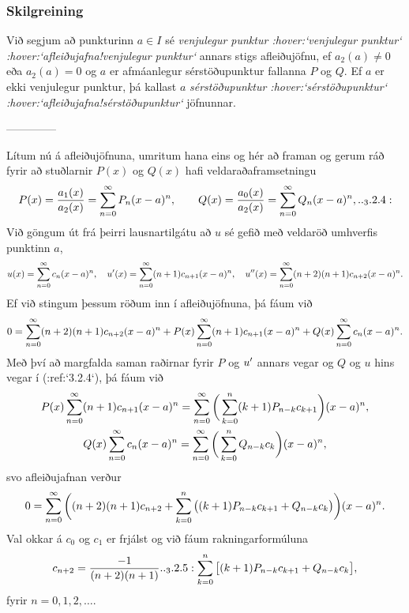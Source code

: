 \subsubsection{Skilgreining}
Við segjum að punkturinn $a\in I$ sé {\it venjulegur
punktur :hover:`venjulegur punktur` :hover:`afleiðujafna!venjulegur
punktur`} annars stigs
afleiðujöfnu, ef
$a_2(a)\neq 0$ eða $a_2(a)=0$ og $a$ er afmáanlegur sérstöðupunktur
fallanna $P$ og $Q$.  Ef $a$ er ekki venjulegur punktur, þá kallast $a$ {\it
sérstöðupunktur :hover:`sérstöðupunktur` :hover:`afleiðujafna!sérstöðupunktur`}
jöfnunnar. 


--------------




Lítum nú á afleiðujöfnuna, umritum hana eins og hér að framan
og gerum ráð fyrir að stuðlarnir $P(x)$ og $Q(x)$ hafi
veldaraðaframsetningu 
 \begin{equation*}
P(x)=\dfrac{a_1(x)}{a_2(x)}= \sum_{n=0}\sp \infty P_n(x-a)\sp n,
\qquad
Q(x)=\dfrac{a_0(x)}{a_2(x)}= \sum_{n=0}\sp \infty Q_n(x-a)\sp n,

.. _3.2.4:

 \end{equation*}
Við göngum út frá þeirri lausnartilgátu að $u$ sé gefið með veldaröð 
umhverfis punktinn $a$,
$$
u(x)=\sum\limits_{n=0}\sp\infty c_n(x-a)\sp n, \quad
u'(x)=\sum\limits_{n=0}\sp\infty (n+1)c_{n+1}(x-a)\sp n, \quad
u{\sp{\prime\prime}}(x)=\sum\limits_{n=0}\sp\infty (n+2)(n+1)c_{n+2}(x-a)\sp n.
 $$
Ef við stingum þessum röðum  inn í afleiðujöfnuna, þá fáum við 
 $$
0= \sum_{n=0}\sp \infty (n+2)(n+1)c_{n+2}(x-a)\sp n +
P(x)\sum_{n=0}\sp \infty (n+1)c_{n+1}(x-a)\sp n +
Q(x)\sum_{n=0}\sp \infty c_n(x-a)\sp n.
 $$
Með því að margfalda saman raðirnar fyrir $P$ og $u{\sp{\prime}}$ annars vegar 
og $Q$ og $u$ hins vegar í (:ref:`3.2.4`), þá fáum við 
\begin{gather*}
P(x)\sum_{n=0}\sp \infty (n+1)c_{n+1}(x-a)\sp n=
\sum_{n=0}\sp\infty  
\bigg(\sum_{k=0}\sp n (k+1)P_{n-k}c_{k+1}\bigg)(x-a)\sp n,\\
Q(x)\sum_{n=0}\sp \infty c_n(x-a)\sp n=
 \sum_{n=0}\sp\infty  
\bigg( \sum_{k=0}\sp n  Q_{n-k}c_k\bigg) (x-a)\sp n,
\end{gather*}
svo afleiðujafnan verður
$$
0= \sum_{n=0}\sp \infty 
\bigg((n+2)(n+1)c_{n+2} +
\sum_{k=0}\sp{n} \big((k+1)P_{n-k}c_{k+1}+
Q_{n-k} c_k\big)\bigg)(x-a)\sp n.
$$
Val okkar á $c_0$ og $c_1$ er frjálst og við fáum rakningarformúluna
 \begin{equation*} c_{n+2} = \dfrac{-1}{(n+2)(n+1)}

.. _3.2.5:

\sum_{k=0}\sp n \big[(k+1)P_{n-k}c_{k+1} +  Q_{n-k}c_k\big],
 \end{equation*}
fyrir $n=0,1,2,\dots$. 

